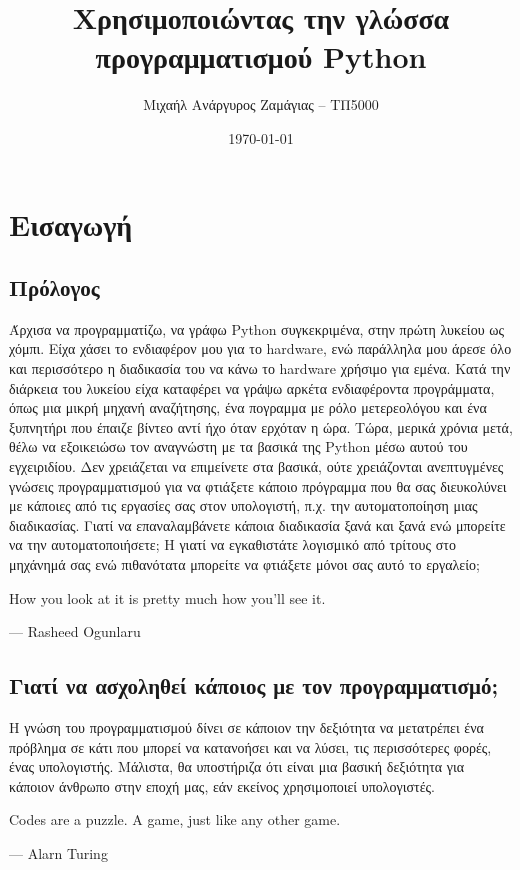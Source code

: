 \documentclass[12pt]{extreport}
\title{Χρησιμοποιώντας την γλώσσα προγραμματισμού Python}
\author{Μιχαήλ Ανάργυρος Ζαμάγιας -- ΤΠ5000}
\date{\today}
\begin{document}
\maketitle

\tableofcontents
\newpage

\chapter{Εισαγωγή}
\newpage

\section{Πρόλογος}

Άρχισα να προγραμματίζω, να γράφω Python συγκεκριμένα, στην πρώτη λυκείου ως χόμπι. Είχα χάσει το ενδιαφέρον μου για το hardware, ενώ παράλληλα μου άρεσε όλο και περισσότερο η διαδικασία του να κάνω το hardware χρήσιμο για εμένα. Κατά την διάρκεια του λυκείου είχα καταφέρει να γράψω αρκέτα ενδιαφέροντα προγράμματα, όπως μια μικρή μηχανή αναζήτησης, ένα πογραμμα με ρόλο μετερεολόγου και ένα ξυπνητήρι που έπαιζε βίντεο αντί ήχο όταν ερχόταν η ώρα. Τώρα, μερικά χρόνια μετά, θέλω να εξοικειώσω τον αναγνώστη με τα βασικά της Python μέσω αυτού του εγχειριδίου. Δεν χρειάζεται να επιμείνετε στα βασικά, ούτε χρειάζονται ανεπτυγμένες γνώσεις προγραμματισμού για να φτιάξετε κάποιο πρόγραμμα που θα σας διευκολύνει με κάποιες από τις εργασίες σας στον υπολογιστή, π.χ. την αυτοματοποίηση μιας διαδικασίας. Γιατί να επαναλαμβάνετε κάποια διαδικασία ξανά και ξανά ενώ μπορείτε να την αυτοματοποιήσετε; Η γιατί να εγκαθιστάτε λογισμικό από τρίτους στο μηχάνημά σας ενώ πιθανότατα μπορείτε να φτιάξετε μόνοι σας αυτό το εργαλείο;

\epigraph{How you look at it is pretty much how you'll see it.}{--- Rasheed Ogunlaru}

\section{Γιατί να ασχοληθεί κάποιος με τον προγραμματισμό;}

Η γνώση του προγραμματισμού δίνει σε κάποιον την δεξιότητα να μετατρέπει ένα πρόβλημα σε κάτι που μπορεί να κατανοήσει και να λύσει, τις περισσότερες φορές, ένας υπολογιστής. Μάλιστα, θα υποστήριζα ότι είναι μια βασική δεξιότητα για κάποιον άνθρωπο στην εποχή μας, εάν εκείνος χρησιμοποιεί υπολογιστές. 

\epigraph{Codes are a puzzle. A game, just like any other game.}{--- Alarn Turing}
\end{document}
